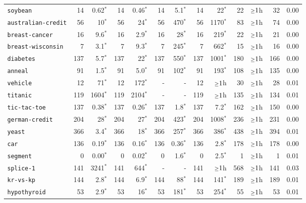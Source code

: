 \begin{tabular}{lrrrrrrrrrrrr}
\texttt{soybean} & 14 & 0.62$^*$ & 14 & 0.46$^*$ & 14 & 5.1$^*$ & 14 & 22$^*$ & 22 & $\mathsmaller{\geq}1$h & 32 & 0.00\\
\texttt{australian-credit} & 56 & 10$^*$ & 56 & 24$^*$ & 56 & 470$^*$ & 56 & 1170$^*$ & 83 & $\mathsmaller{\geq}1$h & 74 & 0.00\\
\texttt{breast-cancer} & 16 & 9.6$^*$ & 16 & 2.9$^*$ & 16 & 28$^*$ & 16 & 219$^*$ & 22 & $\mathsmaller{\geq}1$h & 21 & 0.00\\
\texttt{breast-wisconsin} & 7 & 3.1$^*$ & 7 & 9.3$^*$ & 7 & 245$^*$ & 7 & 662$^*$ & 15 & $\mathsmaller{\geq}1$h & 16 & 0.00\\
\texttt{diabetes} & 137 & 5.7$^*$ & 137 & 22$^*$ & 137 & 550$^*$ & 137 & 1001$^*$ & 180 & $\mathsmaller{\geq}1$h & 166 & 0.00\\
\texttt{anneal} & 91 & 1.5$^*$ & 91 & 5.0$^*$ & 91 & 102$^*$ & 91 & 193$^*$ & 108 & $\mathsmaller{\geq}1$h & 135 & 0.00\\
\texttt{vehicle} & 12 & 71$^*$ & 12 & 172$^*$ & - & - & 12 & $\mathsmaller{\geq}1$h & 30 & $\mathsmaller{\geq}1$h & 28 & 0.01\\
\texttt{titanic} & 119 & 1604$^*$ & 119 & 2104$^*$ & - & - & 119 & $\mathsmaller{\geq}1$h & 135 & $\mathsmaller{\geq}1$h & 134 & 0.01\\
\texttt{tic-tac-toe} & 137 & 0.38$^*$ & 137 & 0.26$^*$ & 137 & 1.8$^*$ & 137 & 7.2$^*$ & 162 & $\mathsmaller{\geq}1$h & 150 & 0.00\\
\texttt{german-credit} & 204 & 28$^*$ & 204 & 27$^*$ & 204 & 423$^*$ & 204 & 1008$^*$ & 236 & $\mathsmaller{\geq}1$h & 231 & 0.00\\
\texttt{yeast} & 366 & 3.4$^*$ & 366 & 18$^*$ & 366 & 257$^*$ & 366 & 386$^*$ & 438 & $\mathsmaller{\geq}1$h & 394 & 0.01\\
\texttt{car} & 136 & 0.19$^*$ & 136 & 0.16$^*$ & 136 & 0.36$^*$ & 136 & 2.8$^*$ & 178 & $\mathsmaller{\geq}1$h & 178 & 0.00\\
\texttt{segment} & 0 & 0.00$^*$ & 0 & 0.02$^*$ & 0 & 1.6$^*$ & 0 & 2.5$^*$ & 1 & $\mathsmaller{\geq}1$h & 1 & 0.01\\
\texttt{splice-1} & 141 & 3241$^*$ & 141 & 644$^*$ & - & - & 141 & $\mathsmaller{\geq}1$h & 568 & $\mathsmaller{\geq}1$h & 141 & 0.03\\
\texttt{kr-vs-kp} & 144 & 2.8$^*$ & 144 & 6.9$^*$ & 144 & 88$^*$ & 144 & 141$^*$ & 189 & $\mathsmaller{\geq}1$h & 189 & 0.01\\
\texttt{hypothyroid} & 53 & 2.9$^*$ & 53 & 16$^*$ & 53 & 181$^*$ & 53 & 254$^*$ & 55 & $\mathsmaller{\geq}1$h & 53 & 0.01\\

\end{tabular}
